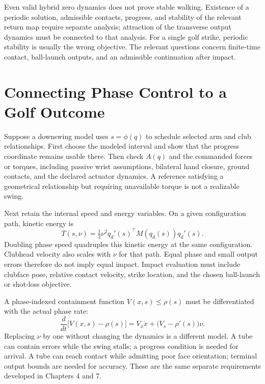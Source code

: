 Even valid hybrid zero dynamics does not prove stable walking. Existence of a periodic solution, admissible contacts, progress, and stability of the relevant return map require separate analysis; attraction of the transverse output dynamics must be connected to that analysis. For a single golf strike, periodic stability is usually the wrong objective. The relevant questions concern finite-time contact, ball-launch outputs, and an admissible continuation after impact.

\section{Connecting Phase Control to a Golf Outcome}

Suppose a downswing model uses $s=\phi(q)$ to schedule selected arm and club relationships. First choose the modeled interval and show that the progress coordinate remains usable there. Then check $A(q)$ and the commanded forces or torques, including passive wrist assumptions, bilateral hand closure, ground contacts, and the declared actuator dynamics. A reference satisfying a geometrical relationship but requiring unavailable torque is not a realizable swing.

Next retain the internal speed and energy variables. On a given configuration path, kinetic energy is
\begin{equation}
T(s,\nu)=\tfrac12\nu^2 q_d'(s)^\top M(q_d(s))q_d'(s).
\end{equation}
Doubling phase speed quadruples this kinetic energy at the same configuration. Clubhead velocity also scales with $\nu$ for that path. Equal phase and small output errors therefore do not imply equal impact. Impact evaluation must include clubface pose, relative contact velocity, strike location, and the chosen ball-launch or shot-loss objective.

A phase-indexed containment function $V(x,s)\leq\rho(s)$ must be differentiated with the actual phase rate:
\begin{equation}
\frac{d}{dt}\bigl[V(x,s)-\rho(s)\bigr]
=V_x\dot x+\bigl(V_s-\rho'(s)\bigr)\nu .
\end{equation}
Replacing $\nu$ by one without changing the dynamics is a different model. A tube can contain errors while the swing stalls; a progress condition is needed for arrival. A tube can reach contact while admitting poor face orientation; terminal output bounds are needed for accuracy. These are the same separate requirements developed in Chapters 4 and 7.

